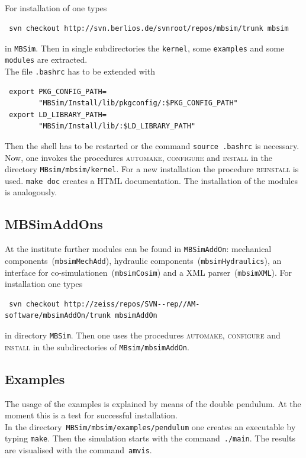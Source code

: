 \subsection{\MBSim}
For installation of \MBSim{} one types
\begin{verbatim}
 svn checkout http://svn.berlios.de/svnroot/repos/mbsim/trunk mbsim
\end{verbatim}
in \texttt{MBSim}. Then in single subdirectories the \texttt{kernel}, some \texttt{examples} and some \texttt{modules} are extracted.\\
The file \texttt{.bashrc} has to be extended with
\begin{verbatim}
 export PKG_CONFIG_PATH=
        "MBSim/Install/lib/pkgconfig/:$PKG_CONFIG_PATH"
 export LD_LIBRARY_PATH=
        "MBSim/Install/lib/:$LD_LIBRARY_PATH"
\end{verbatim}
Then the shell has to be restarted or the command \texttt{source .bashrc} is necessary.\\
Now, one invokes the procedures \textsc{automake, configure} and \textsc{install} in the directory \texttt{MBsim/mbsim/kernel}. For a new installation the procedure \textsc{reinstall} is used. \texttt{make doc} creates a HTML documentation. The installation of the modules is analogously.

\subsection{MBSimAddOns}
{\small At the institute further modules can be found in \texttt{MBSimAddOn}: mechanical components~(\texttt{mbsimMechAdd}), hydraulic components~(\texttt{mbsimHydraulics}), an interface for co-simulationen~(\texttt{mbsimCosim}) and a XML parser~(\texttt{mbsimXML}). For installation one types
\begin{verbatim}
 svn checkout http://zeiss/repos/SVN--rep//AM-software/mbsimAddOn/trunk mbsimAddOn
\end{verbatim}
in directory \texttt{MBSim}. Then one uses the procedures \textsc{automake, configure} and \textsc{install} in the subdirectories of \texttt{MBsim/mbsimAddOn}.
}

\subsection{\MBSim Examples}
The usage of the examples is explained by means of the double pendulum. At the moment this is a test for successful installation.\\
In the directory~\texttt{MBSim/mbsim/examples/pendulum} one creates an executable by typing \texttt{make}. Then the simulation starts with the command~\texttt{./main}. The results are visualised with the command~\texttt{amvis}.
